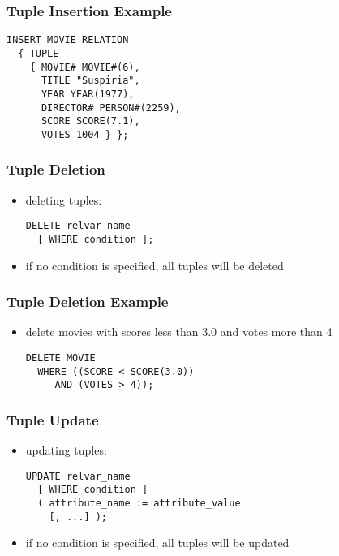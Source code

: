 \documentclass[dvipsnames]{beamer}
\theoremstyle{plain}
\begin{document}
\begin{frame}[fragile]
  \frametitle{Tuple Insertion Example}

  \begin{lstlisting}
INSERT MOVIE RELATION
  { TUPLE
    { MOVIE# MOVIE#(6),
      TITLE "Suspiria",
      YEAR YEAR(1977),
      DIRECTOR# PERSON#(2259),
      SCORE SCORE(7.1),
      VOTES 1004 } };
  \end{lstlisting}
\end{frame}

\begin{frame}[fragile]
  \frametitle{Tuple Deletion}

  \begin{itemize}
    \item deleting tuples:
    \begin{lstlisting}
DELETE relvar_name
  [ WHERE condition ];
    \end{lstlisting}

    \item if no condition is specified, all tuples will be deleted
  \end{itemize}
\end{frame}

\begin{frame}[fragile]
  \frametitle{Tuple Deletion Example}

  \begin{itemize}
    \item delete movies with scores less than 3.0 and votes more than 4
    \begin{lstlisting}
DELETE MOVIE
  WHERE ((SCORE < SCORE(3.0))
     AND (VOTES > 4));
    \end{lstlisting}
  \end{itemize}
\end{frame}

\begin{frame}[fragile]
  \frametitle{Tuple Update}

  \begin{itemize}
    \item updating tuples:
    \begin{lstlisting}
UPDATE relvar_name
  [ WHERE condition ]
  ( attribute_name := attribute_value
    [, ...] );
    \end{lstlisting}

    \item if no condition is specified, all tuples will be updated
  \end{itemize}
\end{frame}
\end{document}
